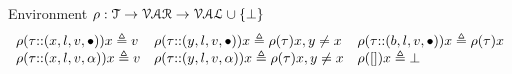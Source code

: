 %
%
%
Environment $ \rho : {\mathcal{T}}  \to \mathcal{VAR} \to \mathcal{VAL} \cup \{\bot\}$
\[
\begin{array}{lll}
\rho(\mathtt{\tau}  {\small ::} (x, l, v, \bullet)) x \triangleq v
&
\rho(\mathtt{\tau} {\small ::} (y, l, v, \bullet)) x \triangleq \rho(\mathtt{\tau}) x, y \neq x
&
\rho(\mathtt{\tau} {\small ::} (b, l, v, \bullet)) x \triangleq \rho(\mathtt{\tau}) x
\\
\rho(\mathtt{\tau} {\small ::} (x, l, v, \alpha)) x \triangleq v
&
\rho(\mathtt{\tau} {\small ::} (y, l, v, \alpha)) x \triangleq \rho(\mathtt{\tau}) x, y \neq x
&
\rho({[]} ) x \triangleq \bot
\end{array}
\]
%
%
